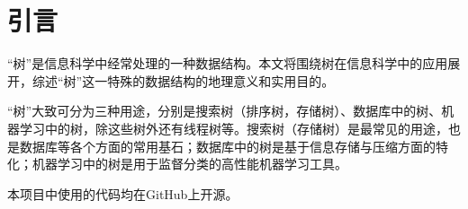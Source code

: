 
\chapter{引言}

“树”是信息科学中经常处理的一种数据结构。本文将围绕树在信息科学中的应用展开，综述“树”这一特殊的数据结构的地理意义和实用目的。

“树”大致可分为三种用途，分别是搜索树（排序树，存储树）、数据库中的树、机器学习中的树，除这些树外还有线程树等。搜索树（存储树）是最常见的用途，也是数据库等各个方面的常用基石；数据库中的树是基于信息存储与压缩方面的特化；机器学习中的树是用于监督分类的高性能机器学习工具。

本项目中使用的代码均在GitHub\cite{github}上开源。
